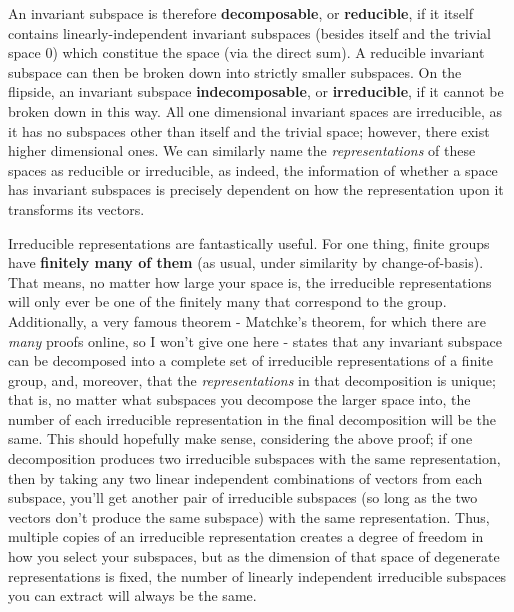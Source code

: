 \documentclass{article}
\begin{document}
An invariant subspace is therefore \textbf{decomposable}, or \textbf{reducible}, if it itself contains linearly-independent invariant subspaces (besides itself and the trivial space {0}) which constitue the space (via the direct sum). A reducible invariant subspace can then be broken down into strictly smaller subspaces. On the flipside, an invariant subspace \textbf{indecomposable}, or \textbf{irreducible}, if it cannot be broken down in this way. All one dimensional invariant spaces are irreducible, as it has no subspaces other than itself and the trivial space; however, there exist higher dimensional ones. We can similarly name the \textit{representations} of these spaces as reducible or irreducible, as indeed, the information of whether a space has invariant subspaces is precisely dependent on how the representation upon it transforms its vectors.

Irreducible representations are fantastically useful. For one thing, finite groups have \textbf{finitely many of them} (as usual, under similarity by change-of-basis). That means, no matter how large your space is, the irreducible representations will only ever be one of the finitely many that correspond to the group. Additionally, a very famous theorem - Matchke's theorem, for which there are \textit{many} proofs online, so I won't give one here - states that any invariant subspace can be decomposed into a complete set of irreducible representations of a finite group, and, moreover, that the \textit{representations} in that decomposition is unique; that is, no matter what subspaces you decompose the larger space into, the number of each irreducible representation in the final decomposition will be the same. This should hopefully make sense, considering the above proof; if one decomposition produces two irreducible subspaces with the same representation, then by taking any two linear independent combinations of vectors from each subspace, you'll get another pair of irreducible subspaces (so long as the two vectors don't produce the same subspace) with the same representation. Thus, multiple copies of an irreducible representation creates a degree of freedom in how you select your subspaces, but as the dimension of that space of degenerate representations is fixed, the number of linearly independent irreducible subspaces you can extract will always be the same.
\end{document}
